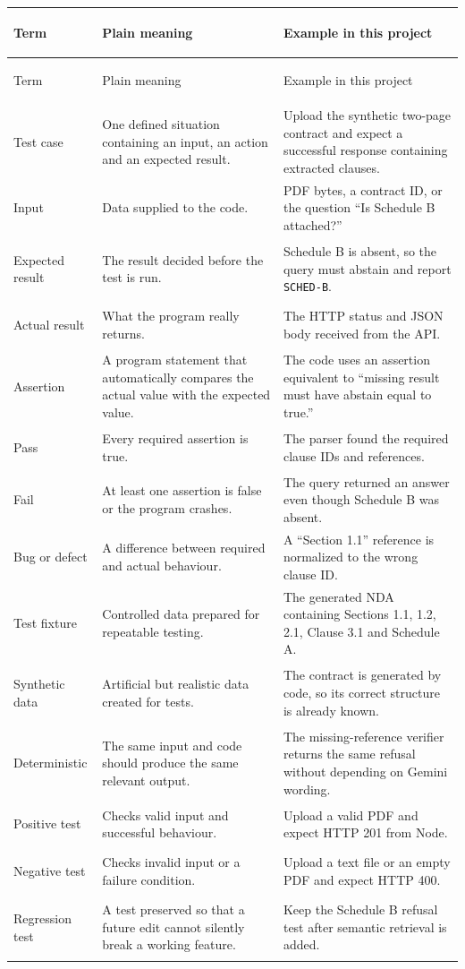 \documentclass[11pt,letterpaper]{article}
\begin{document}
\begin{longtable}{>{\bfseries\raggedright\arraybackslash}p{}>{\raggedright\arraybackslash}p{}>{\raggedright\arraybackslash}p{}}
\toprule
Term & Plain meaning & Example in this project\\
\midrule
\endfirsthead
\toprule
Term & Plain meaning & Example in this project\\
\midrule
\endhead
Test case & One defined situation containing an input, an action and an expected result. & Upload the synthetic two-page contract and expect a successful response containing extracted clauses.\\
Input & Data supplied to the code. & PDF bytes, a contract ID, or the question ``Is Schedule B attached?''\\
Expected result & The result decided before the test is run. & Schedule B is absent, so the query must abstain and report \texttt{SCHED-B}.\\
Actual result & What the program really returns. & The HTTP status and JSON body received from the API.\\
Assertion & A program statement that automatically compares the actual value with the expected value. & The code uses an assertion equivalent to ``missing result must have abstain equal to true.''\\
Pass & Every required assertion is true. & The parser found the required clause IDs and references.\\
Fail & At least one assertion is false or the program crashes. & The query returned an answer even though Schedule B was absent.\\
Bug or defect & A difference between required and actual behaviour. & A ``Section 1.1'' reference is normalized to the wrong clause ID.\\
Test fixture & Controlled data prepared for repeatable testing. & The generated NDA containing Sections 1.1, 1.2, 2.1, Clause 3.1 and Schedule A.\\
Synthetic data & Artificial but realistic data created for tests. & The contract is generated by code, so its correct structure is already known.\\
Deterministic & The same input and code should produce the same relevant output. & The missing-reference verifier returns the same refusal without depending on Gemini wording.\\
Positive test & Checks valid input and successful behaviour. & Upload a valid PDF and expect HTTP 201 from Node.\\
Negative test & Checks invalid input or a failure condition. & Upload a text file or an empty PDF and expect HTTP 400.\\
Regression test & A test preserved so that a future edit cannot silently break a working feature. & Keep the Schedule B refusal test after semantic retrieval is added.\\
\bottomrule
\end{longtable}
\end{document}
